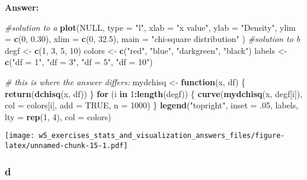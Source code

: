 \documentclass[]{article}
\newenvironment{Shaded}{\begin{snugshade}}{\end{snugshade}}
\newcommand{\CommentTok}[1]{\textcolor[rgb]{0.56,0.35,0.01}{\textit{#1}}}
\newcommand{\ControlFlowTok}[1]{\textcolor[rgb]{0.13,0.29,0.53}{\textbf{#1}}}
\newcommand{\DataTypeTok}[1]{\textcolor[rgb]{0.13,0.29,0.53}{#1}}
\newcommand{\DecValTok}[1]{\textcolor[rgb]{0.00,0.00,0.81}{#1}}
\newcommand{\FloatTok}[1]{\textcolor[rgb]{0.00,0.00,0.81}{#1}}
\newcommand{\KeywordTok}[1]{\textcolor[rgb]{0.13,0.29,0.53}{\textbf{#1}}}
\newcommand{\NormalTok}[1]{#1}
\newcommand{\OperatorTok}[1]{\textcolor[rgb]{0.81,0.36,0.00}{\textbf{#1}}}
\newcommand{\OtherTok}[1]{\textcolor[rgb]{0.56,0.35,0.01}{#1}}
\newcommand{\StringTok}[1]{\textcolor[rgb]{0.31,0.60,0.02}{#1}}
\begin{document}
\textbf{Answer:}

\begin{Shaded}
\begin{Highlighting}[]
\CommentTok{#solution to a}
\KeywordTok{plot}\NormalTok{(}\OtherTok{NULL}\NormalTok{, }\DataTypeTok{type =} \StringTok{"l"}\NormalTok{, }
  \DataTypeTok{xlab =} \StringTok{"x value"}\NormalTok{, }\DataTypeTok{ylab =} \StringTok{"Density"}\NormalTok{, }
  \DataTypeTok{ylim =} \KeywordTok{c}\NormalTok{(}\DecValTok{0}\NormalTok{, }\FloatTok{0.30}\NormalTok{), }\DataTypeTok{xlim =} \KeywordTok{c}\NormalTok{(}\DecValTok{0}\NormalTok{, }\FloatTok{32.5}\NormalTok{), }
  \DataTypeTok{main =} \StringTok{"chi-square distribution"}
\NormalTok{)}
\CommentTok{#solution to b}
\NormalTok{degf <-}\StringTok{ }\KeywordTok{c}\NormalTok{(}\DecValTok{1}\NormalTok{, }\DecValTok{3}\NormalTok{, }\DecValTok{5}\NormalTok{, }\DecValTok{10}\NormalTok{)}
\NormalTok{colors <-}\StringTok{ }\KeywordTok{c}\NormalTok{(}\StringTok{"red"}\NormalTok{, }\StringTok{"blue"}\NormalTok{, }\StringTok{"darkgreen"}\NormalTok{, }\StringTok{"black"}\NormalTok{)}
\NormalTok{labels <-}\StringTok{ }\KeywordTok{c}\NormalTok{(}\StringTok{"df = 1"}\NormalTok{, }\StringTok{"df = 3"}\NormalTok{, }\StringTok{"df = 5"}\NormalTok{, }\StringTok{"df = 10"}\NormalTok{)}

\CommentTok{# this is where the answer differs:}
\NormalTok{mydchisq <-}\StringTok{ }\ControlFlowTok{function}\NormalTok{(x, df) \{}
  \KeywordTok{return}\NormalTok{(}\KeywordTok{dchisq}\NormalTok{(x, df))}
\NormalTok{\}}
\ControlFlowTok{for}\NormalTok{ (i }\ControlFlowTok{in} \DecValTok{1}\OperatorTok{:}\KeywordTok{length}\NormalTok{(degf)) \{}
  \KeywordTok{curve}\NormalTok{(}\KeywordTok{mydchisq}\NormalTok{(x, degf[i]), }\DataTypeTok{col =}\NormalTok{ colors[i], }\DataTypeTok{add =} \OtherTok{TRUE}\NormalTok{, }\DataTypeTok{n =} \DecValTok{1000}\NormalTok{)}
\NormalTok{\}}
\KeywordTok{legend}\NormalTok{(}\StringTok{"topright"}\NormalTok{, }\DataTypeTok{inset =} \FloatTok{.05}\NormalTok{, labels, }\DataTypeTok{lty =} \KeywordTok{rep}\NormalTok{(}\DecValTok{1}\NormalTok{, }\DecValTok{4}\NormalTok{), }\DataTypeTok{col =}\NormalTok{ colors)}
\end{Highlighting}
\end{Shaded}

\texttt{[image: w5\_exercises\_stats\_and\_visualization\_answers\_files/figure-latex/unnamed-chunk-15-1.pdf]}

\hypertarget{d-2}{%
\subsubsection{d}\label{d-2}}
\end{document}
